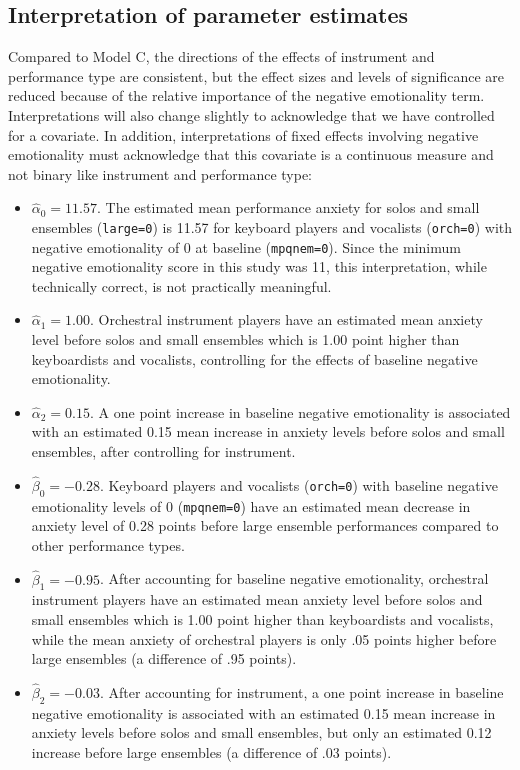 \documentclass[
]{krantz}
\providecommand{\tightlist}{%
  \setlength{\itemsep}{0pt}\setlength{\parskip}{0pt}}
\begin{document}
\hypertarget{interp:modeld}{%
\subsection{Interpretation of parameter estimates}\label{interp:modeld}}

Compared to Model C, the directions of the effects of instrument and performance type are consistent, but the effect sizes and levels of significance are reduced because of the relative importance of the negative emotionality term. Interpretations will also change slightly to acknowledge that we have controlled for a covariate. In addition, interpretations of fixed effects involving negative emotionality must acknowledge that this covariate is a continuous measure and not binary like instrument and performance type:

\begin{itemize}
\tightlist
\item
  \(\hat{\alpha}_{0} = 11.57\). The estimated mean performance anxiety for solos and small ensembles (\texttt{large=0}) is 11.57 for keyboard players and vocalists (\texttt{orch=0}) with negative emotionality of 0 at baseline (\texttt{mpqnem=0}). Since the minimum negative emotionality score in this study was 11, this interpretation, while technically correct, is not practically meaningful.
\item
  \(\hat{\alpha}_{1} = 1.00\). Orchestral instrument players have an estimated mean anxiety level before solos and small ensembles which is 1.00 point higher than keyboardists and vocalists, controlling for the effects of baseline negative emotionality.
\item
  \(\hat{\alpha}_{2} = 0.15\). A one point increase in baseline negative emotionality is associated with an estimated 0.15 mean increase in anxiety levels before solos and small ensembles, after controlling for instrument.
\item
  \(\hat{\beta}_{0} = -0.28\). Keyboard players and vocalists (\texttt{orch=0}) with baseline negative emotionality levels of 0 (\texttt{mpqnem=0}) have an estimated mean decrease in anxiety level of 0.28 points before large ensemble performances compared to other performance types.
\item
  \(\hat{\beta}_{1} = -0.95\). After accounting for baseline negative emotionality, orchestral instrument players have an estimated mean anxiety level before solos and small ensembles which is 1.00 point higher than keyboardists and vocalists, while the mean anxiety of orchestral players is only .05 points higher before large ensembles (a difference of .95 points).
\item
  \(\hat{\beta}_{2} = -0.03\). After accounting for instrument, a one point increase in baseline negative emotionality is associated with an estimated 0.15 mean increase in anxiety levels before solos and small ensembles, but only an estimated 0.12 increase before large ensembles (a difference of .03 points).
\end{itemize}
\end{document}

